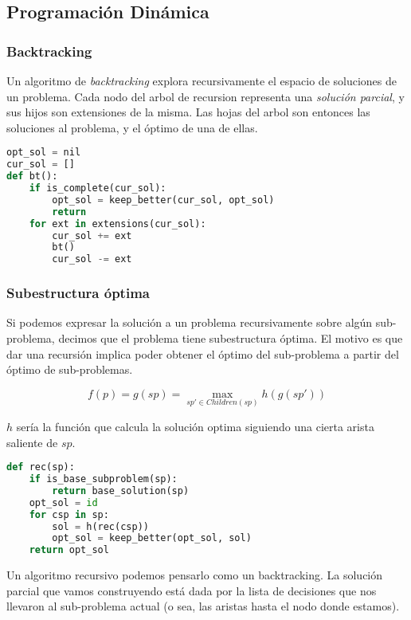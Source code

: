 
\subsection{Programación Dinámica}

\subsubsection*{Backtracking}

Un algoritmo de \textit{backtracking} explora recursivamente el espacio de soluciones de un problema. Cada nodo del arbol de recursion representa una \textit{solución parcial}, y sus hijos son extensiones de la misma. Las hojas del arbol son entonces las soluciones al problema, y el óptimo de una de ellas.

\begin{lstlisting}[language=python]
opt_sol = nil
cur_sol = []
def bt():
    if is_complete(cur_sol):
        opt_sol = keep_better(cur_sol, opt_sol)
        return
    for ext in extensions(cur_sol):
        cur_sol += ext
        bt()
        cur_sol -= ext
\end{lstlisting}

\subsubsection*{Subestructura óptima}

Si podemos expresar la solución a un problema recursivamente sobre algún sub-problema, decimos que el problema tiene subestructura óptima. El motivo es que dar una recursión implica poder obtener el óptimo del sub-problema a partir del óptimo de sub-problemas.

\begin{equation}
f(p) = g(sp) = \max_{sp' \in Children(sp)} h(g(sp'))
\end{equation}

$h$ sería la función que calcula la solución optima siguiendo una cierta arista saliente de $sp$.

\begin{lstlisting}[language=python]
def rec(sp):
    if is_base_subproblem(sp):
        return base_solution(sp)
    opt_sol = id
    for csp in sp:
        sol = h(rec(csp))
        opt_sol = keep_better(opt_sol, sol)
    return opt_sol
\end{lstlisting}

Un algoritmo recursivo podemos pensarlo como un backtracking. La solución parcial que vamos construyendo está dada por la lista de decisiones que nos llevaron al sub-problema actual (o sea, las aristas hasta el nodo donde estamos).

